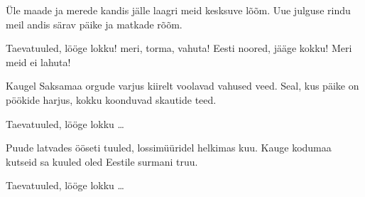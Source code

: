 \"Ule maade ja merede kandis
j\"alle laagri meid kesksuve l\~o\~om.
Uue julguse rindu meil andis
s\"arav p\"aike ja matkade r\~o\~om.

Taevatuuled, l\"o\"oge lokku!
meri, torma, vahuta!
Eesti noored, j\"a\"age kokku!
Meri meid ei lahuta!

Kaugel Saksamaa orgude varjus
kiirelt  voolavad vahused veed.
Seal, kus p\"aike on p\"o\"okide harjus,
kokku koonduvad skautide teed.

Taevatuuled, l\"o\"oge lokku \ldots

Puude latvades \"o\"oseti tuuled,
lossim\"u\"uridel helkimas kuu.
Kauge kodumaa kutseid sa kuuled
oled Eestile surmani truu.

Taevatuuled, l\"o\"oge lokku \ldots